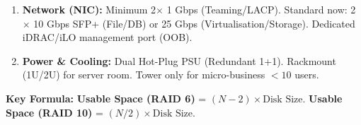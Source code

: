 \documentclass[11pt]{article}
\begin{document}
\begin{methode}
\begin{enumerate}
\begin{itemize}
\begin{itemize}
            \item RAID 1 (Mirror): 2 disks. Safety, no capacity gain. Good for OS.
            \item RAID 5 (Stripe + Parity): Min 3 disks. Good read, slow write rebuild. \textbf{Avoid for heavy DB writes.}
            \item \textbf{RAID 6 (Dual Parity):} Min 4 disks. Standard for File Server capacity + safety (survives 2 disk failures).
            \item \textbf{RAID 10 (Mirrored Stripes):} Min 4 disks (even). \textbf{Best Performance + Safety.} Use for Database, Hyper-V host, high-write File Server. 50\% capacity overhead.
        \end{itemize}
        \item Disk Type: NL-SAS / Enterprise SATA (Capacity) vs SAS / NVMe SSD (Performance). \textbf{NVMe U.2/U.3 for DB/Logs.}
    \end{itemize}
    \item \textbf{Network (NIC):} Minimum 2$\times$ 1 Gbps (Teaming/LACP). Standard now: 2$\times$ 10 Gbps SFP+ (File/DB) or 25 Gbps (Virtualisation/Storage). Dedicated iDRAC/iLO management port (OOB).
    \item \textbf{Power \& Cooling:} Dual Hot-Plug PSU (Redundant 1+1). Rackmount (1U/2U) for server room. Tower only for micro-business $<10$ users.
\end{enumerate}
\textbf{Key Formula:} \textbf{Usable Space (RAID 6)} = $(N - 2) \times \text{Disk Size}$. \textbf{Usable Space (RAID 10)} = $(N / 2) \times \text{Disk Size}$.
\end{methode}
\end{document}

